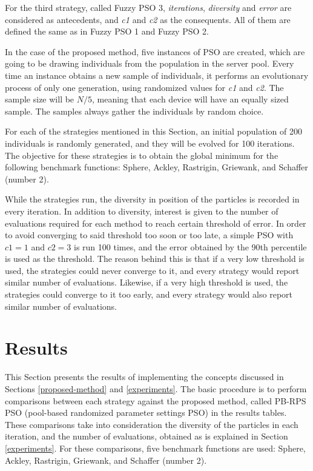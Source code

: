 For the third strategy, called Fuzzy PSO 3, \textit{iterations}, \textit{diversity} and \textit{error} are considered as antecedents, and \textit{c1} and \textit{c2} as the consequents. All of them are defined the same as in Fuzzy PSO 1 and Fuzzy PSO 2.



In the case of the proposed method, five instances of PSO are created, which are going to be drawing individuals from the population in the server pool. Every time an instance obtains a new sample of individuals, it performs an evolutionary process of only one generation, using randomized values for \textit{c1} and \textit{c2}. The sample size will be $N/5$, meaning that each device will have an equally sized sample. The samples always gather the individuals by random choice.

For each of the strategies mentioned in this Section, an initial population of 200 individuals is randomly generated, and they will be evolved for 100 iterations. The objective for these strategies is to obtain the global minimum for the following benchmark functions: Sphere, Ackley, Rastrigin, Griewank, and Schaffer (number 2).

While the strategies run, the diversity in position of the particles is recorded in every iteration. In addition to diversity, interest is given to the number of evaluations required for each method to reach certain threshold of error. In order to avoid converging to said threshold too soon or too late, a simple PSO with $c1 = 1$ and $c2 = 3$ is run 100 times, and the error obtained by the 90th percentile is used as the threshold. The reason behind this is that if a very low threshold is used, the strategies could never converge to it, and every strategy would report similar number of evaluations. Likewise, if a very high threshold is used, the strategies could converge to it too early, and every strategy would also report similar number of evaluations.


\section{Results}
\label{results}

This Section presents the results of implementing the concepts discussed in Sections \ref{proposed-method} and \ref{experiments}. The basic procedure is to perform comparisons between each strategy against the proposed method, called PB-RPS PSO (pool-based randomized parameter settings PSO) in the results tables. These comparisons take into consideration the diversity of the particles in each iteration, and the number of evaluations, obtained as is explained in Section \ref{experiments}. For these comparisons, five benchmark functions are used: Sphere, Ackley, Rastrigin, Griewank, and Schaffer (number 2).


